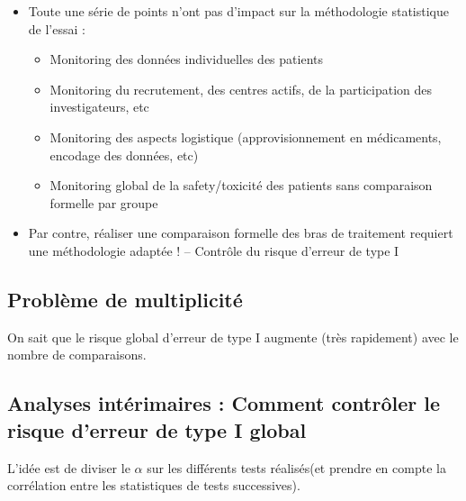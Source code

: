 \begin{itemize}
    \item Toute une série de points n’ont pas d’impact sur la méthodologie statistique de l’essai :
    \begin{itemize}
        \item Monitoring des données individuelles des patients
\item Monitoring du recrutement, des centres actifs, de la participation des
investigateurs, etc
\item Monitoring des aspects logistique (approvisionnement en médicaments, encodage des données, etc)
\item Monitoring global de la safety/toxicité des patients sans comparaison formelle par groupe
    \end{itemize}
\item Par contre, réaliser une comparaison formelle des bras de traitement requiert une méthodologie adaptée !
– Contrôle du risque d’erreur de type I
\end{itemize}
\subsection{Problème de multiplicité}
On sait que le risque global d’erreur de type I augmente (très rapidement) avec le nombre de comparaisons.

\subsection{Analyses intérimaires : Comment contrôler le risque d’erreur de type I global}

L'idée est de diviser le $\alpha$ sur les différents tests réalisés(et prendre en compte la corrélation entre les statistiques de tests successives).

